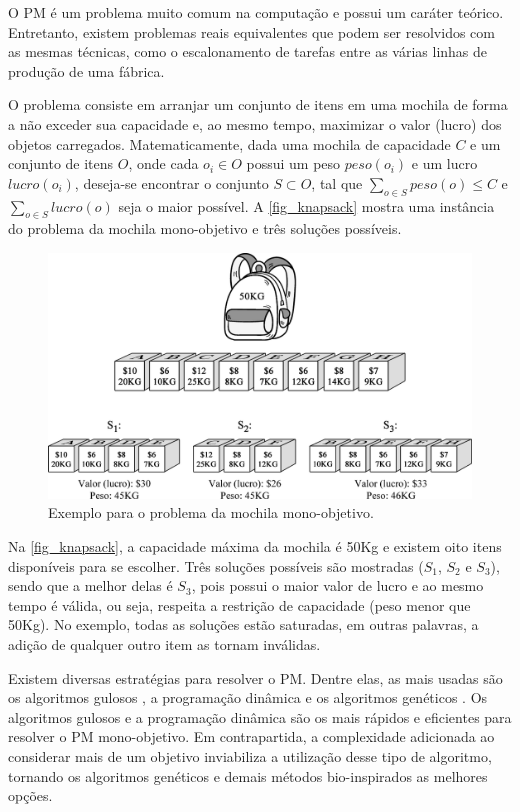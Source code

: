 O \ac{PM} é um problema muito comum na computação e possui um caráter teórico. Entretanto, existem problemas reais equivalentes que podem ser resolvidos com as mesmas técnicas, como o escalonamento de tarefas entre as várias linhas de produção de uma fábrica.

O problema consiste em arranjar um conjunto de itens em uma mochila de forma a não exceder sua capacidade e, ao mesmo tempo, maximizar o valor (lucro) dos objetos carregados. Matematicamente, dada uma mochila de capacidade $C$ e um conjunto de itens $O$, onde cada $o_i \in O$ possui um peso $peso(o_i)$ e um lucro $lucro(o_i)$, deseja-se encontrar o conjunto $S \subset O$, tal que $\sum_{o \in S} peso(o) \leq C$ e $\sum_{o \in S} lucro(o)$ seja o maior possível. A \autoref{fig_knapsack} mostra uma instância do problema da mochila mono-objetivo e três soluções possíveis.

\begin{figure}[!htbp]
	\centering
	\includegraphics[width=1\textwidth]{cap_problemas/figs/mochila.png}
	\caption{\label{fig_knapsack}Exemplo para o problema da mochila mono-objetivo.}
\end{figure}

Na \autoref{fig_knapsack}, a capacidade máxima da mochila é 50Kg e existem oito itens disponíveis para se escolher. Três soluções possíveis são mostradas ($S_1$, $S_2$ e $S_3$), sendo que a melhor delas é $S_3$, pois possui o maior valor de lucro e ao mesmo tempo é válida, ou seja, respeita a restrição de capacidade (peso menor que 50Kg). No exemplo, todas as soluções estão saturadas, em outras palavras, a adição de qualquer outro item as tornam inválidas.

Existem diversas estratégias para resolver o \ac{PM}. Dentre elas, as mais usadas são os algoritmos gulosos \cite{KnapsackGreedy}, a programação dinâmica \cite{KnapsackDynamic} e os algoritmos genéticos \cite{KnapsackGA}. Os algoritmos gulosos e a programação dinâmica são os mais rápidos e eficientes para resolver o PM mono-objetivo. Em contrapartida, a complexidade adicionada ao considerar mais de um objetivo inviabiliza a utilização desse tipo de algoritmo, tornando os algoritmos genéticos e demais métodos bio-inspirados as melhores opções.

